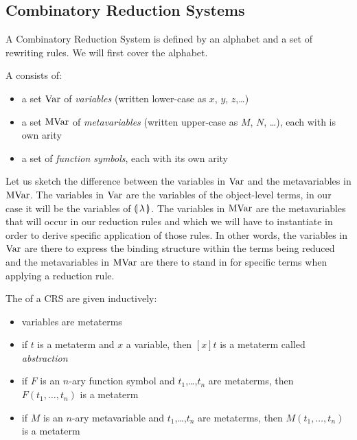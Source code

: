 \subsection{Combinatory Reduction Systems}
\label{ssec:crs}

A Combinatory Reduction System is defined by an alphabet and a set of
rewriting rules. We will first cover the alphabet.

\begin{definition}
  A  consists of:
  \begin{itemize}
  \item a set $\operatorname{Var}$ of \emph{variables} (written lower-case as $x$, $y$,
    $z$,\ldots)
  \item a set $\operatorname{MVar}$ of \emph{metavariables} (written upper-case as $M$,
    $N$, \ldots), each with is own arity
  \item a set of \emph{function symbols}, each with its own arity
  \end{itemize}
\end{definition}

Let us sketch the difference between the variables in $\operatorname{Var}$ and the
metavariables in $\operatorname{MVar}$. The variables in $\operatorname{Var}$ are the variables of the
object-level terms, in our case it will be the variables of
$\llparenthesis \, \lambda \, \rrparenthesis$. The variables in $\operatorname{MVar}$ are the metavariables that
will occur in our reduction rules and which we will have to instantiate in
order to derive specific application of those rules. In other words, the
variables in $\operatorname{Var}$ are there to express the binding structure within the
terms being reduced and the metavariables in $\operatorname{MVar}$ are there to stand in
for specific terms when applying a reduction rule.

\begin{definition}
  The  of a CRS are given inductively:
  \begin{itemize}
  \item variables are metaterms
  \item if $t$ is a metaterm and $x$ a variable, then $[x]t$ is a metaterm
    called \emph{abstraction}
  \item if $F$ is an $n$-ary function symbol and $t_1$,\ldots,$t_n$ are
    metaterms, then $F(t_1,\ldots,t_n)$ is a metaterm
  \item if $M$ is an $n$-ary metavariable and $t_1$,\ldots,$t_n$ are
    metaterms, then $M(t_1,\ldots,t_n)$ is a metaterm
  \end{itemize}
\end{definition}


